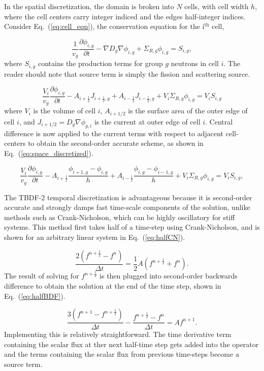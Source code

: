 \documentclass[12pt]{article}
\newcommand{\fn}[1]{\left( #1 \right)}
\newcommand{\dxdt}[1]{\frac{\partial #1}{\partial t}}
\newcommand{\be}{\begin{equation}}
\newcommand{\ee}{\end{equation}}
\newcommand{\LEQ}[1]{\label{eq:#1}}
\newcommand{\EQ}[1]{Eq.~(\ref{eq:#1})}
\newcommand{\half}{\frac{1}{2}}
\begin{document}
In the spatial discretization, the domain is broken into $N$ cells, with cell width $h$, where the cell 
	centers carry integer indiced and the edges half-integer indices. 
Consider \EQ{cell_eqn}, the conservation equation for the i$^{\text{th}}$ cell,

\be
	 \frac{1}{v_g} \dxdt{\phi_{i,g}} - \nabla D_{g} \nabla \phi_{i,g} + 	
	 	\Sigma_{R,g} \phi_{i,g}  =  S_{i,g},
	\LEQ{cell_eqn} 
\ee
where $S_{i,g}$ contains the production terms for group $g$ neutrons in cell $i$. 
The reader should note that source term is simply the fission and scattering source.

\be
	\frac{V_i}{v_g} \dxdt{\phi_{i,g}} - A_{i+\half} J_{i+\half,g} + A_{i-\half} 
		J_{i-\half,g} + V_i \Sigma_{R,g} \phi_{i,g} = V_i S_{i,g}
\ee
where $V_i $ is the volume of cell $i$, $ A_{i+1/2} $ is the surface area of the outer edge of cell $i$, and 
	$ J_{i+1/2} = D_g \nabla \phi_{g,i} $ is the current at outer edge of cell $i$. 
Central difference is now applied to the current terms with respect to adjacent cell-centers to obtain
	the second-order accurate scheme, as shown in \EQ{space_discretized}.

\be
	\frac{V_i}{v_g} \dxdt{\phi_{i,g}} - A_{i+\half} \frac{\phi_{i+1,g} - 
		\phi_{i,g}}{h} + A_{i-\half} \frac{\phi_{i,g} - \phi_{i-1,g}}{h} + 
		V_i \Sigma_{R,g} \phi_{i,g} = V_i S_{i,g},
 	\LEQ{space_discretized} 
\ee


The TBDF-2 temporal discretization is advantageous because it is second-order accurate and strongly 
	damps fast time-scale components of the solution, unlike methods such as Crank-Nicholson, which can be highly oscillatory for stiff systems. 
This method first takes half of a time-step using Crank-Nicholson, and is shown for an arbitrary linear 
system in \EQ{halfCN}. 

\be
	\frac{2 \fn{ f^{n+\half} - f^n }}{\Delta t} =  \half A \fn{f^{n+\half} + f^n}.
	\LEQ{halfCN} 
\ee
The result of solving for $f^{n+\half}$ is then plugged into second-order backwards difference to 
	obtain the solution at the end of the time step, shown in \EQ{halfBDF}.

\be
	\frac{3 \fn{ f^{n+1} - f^{n+\half} }}{\Delta t} - \frac{f^{n+\half} - 
		f^n}{\Delta t} = A f^{n+1}.
	\LEQ{halfBDF} 
\ee 
Implementing this is relatively straightforward. 
The time derivative term containing the scalar flux at ther next half-time step gets added into the 
	operator and the terms containing the scalar flux from previous time-steps become a source term.
\end{document}
